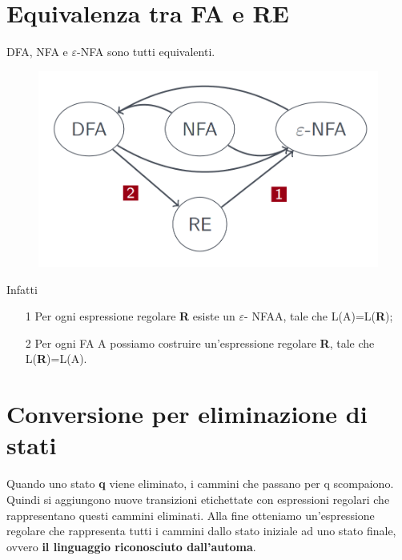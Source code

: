 \section{Equivalenza tra FA e RE}
DFA, NFA e $\varepsilon$\textrm{-NFA} sono tutti equivalenti.

\begin{figure}[h]
\centering 
\includegraphics[scale=0.5]{Immagini/equivalenza3.png}
\end{figure}

Infatti 
\begin{itemize}
\item[1] Per ogni espressione regolare \textbf{R} esiste un $\varepsilon$\textrm{-
NFA}A, tale che L(A)=L(\textbf{R});
\item[2] Per ogni FA A possiamo costruire un'espressione regolare \textbf{R},
tale che L(\textbf{R})=L(A).
\end{itemize}

\section{Conversione per eliminazione di stati}
Quando uno stato \textbf{q} viene eliminato, i cammini che passano per q scompaiono.
Quindi si aggiungono nuove transizioni etichettate con espressioni regolari che 
rappresentano questi cammini eliminati. Alla fine otteniamo un'espressione regolare
che rappresenta tutti i cammini dallo stato iniziale ad uno stato finale, ovvero
\textbf{il linguaggio riconosciuto dall'automa}.






